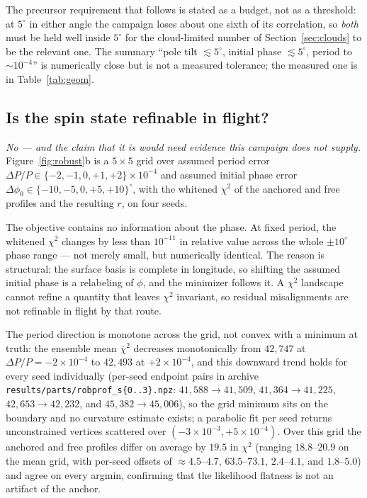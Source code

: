 \documentclass[twocolumn,10pt]{article}
\begin{document}
The precursor requirement that follows is stated as a budget, not as a
threshold: at $5^\circ$ in either angle the campaign loses about one sixth of
its correlation, so \emph{both} must be held well inside $5^\circ$ for the
cloud-limited number of Section~\ref{sec:clouds} to be the relevant one. The
summary ``pole tilt $\lesssim5^\circ$, initial phase $\lesssim5^\circ$, period to
$\sim10^{-4}$'' is numerically close but is not a measured tolerance; the
measured one is in Table~\ref{tab:geom}.

\subsection{Is the spin state refinable in flight?}
\label{sec:proflike}
\emph{No --- and the claim that it is would need evidence this campaign does
not supply.} Figure~\ref{fig:robust}b is
a $5\times5$ grid over assumed period error
$\Delta P/P\in\{-2,-1,0,+1,+2\}\times10^{-4}$ and assumed initial phase error
$\Delta\phi_0\in\{-10,-5,0,+5,+10\}^\circ$, with the whitened $\chi^2$ of the
anchored and free profiles and the resulting $r$, on four seeds.

The objective contains no information about the phase. At fixed period,
the whitened $\chi^2$ changes by less than $10^{-11}$ in relative value across
the whole $\pm10^\circ$ phase range --- not merely small, but numerically identical.
The reason is structural: the surface basis is complete in longitude, so shifting
the assumed initial phase is a relabeling of $\phi$, and the minimizer follows
it. A $\chi^2$ landscape cannot refine a quantity that leaves $\chi^2$
invariant, so residual misalignments are not refinable in flight by that route.

The period direction is monotone across the grid, not convex with a
minimum at truth: the ensemble mean $\bar\chi^2$ decreases monotonically from $42{,}747$ at $\Delta P/P=-2\times10^{-4}$
to $42{,}493$ at $+2\times10^{-4}$, and this downward trend holds for every seed individually (per-seed endpoint pairs in archive \texttt{results/parts/robprof\_s\{0..3\}.npz}: $41{,}588\to41{,}509$, $41{,}364\to41{,}225$, $42{,}653\to42{,}232$, and $45{,}382\to45{,}006$), so the grid minimum sits on
the boundary and no curvature estimate exists; a parabolic fit per seed returns
unconstrained vertices scattered over $(-3\times10^{-3},+5\times10^{-4})$. Over this grid the
anchored and free profiles differ on average by $19.5$ in $\chi^2$ (ranging $18.8$--$20.9$ on the mean grid, with per-seed offsets of $\approx4.5$--$4.7$, $63.5$--$73.1$, $2.4$--$4.1$, and $1.8$--$5.0$) and agree on
every argmin, confirming that the likelihood flatness is not an artifact of the anchor.
\end{document}
